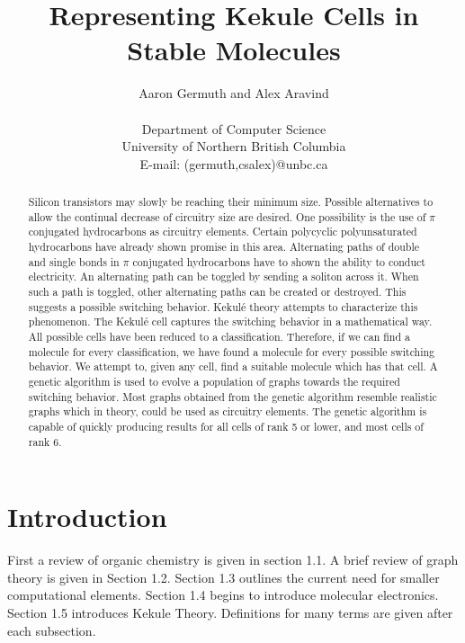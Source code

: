 \documentclass[12pt]{article}
\begin{document}
\title{Representing Kekule Cells in Stable Molecules}
\author{Aaron Germuth and Alex Aravind \\\\  
Department of Computer Science \\
University of Northern British Columbia \\
E-mail: (germuth,csalex)@unbc.ca}
\maketitle


\begin{abstract}

Silicon transistors may slowly be reaching their minimum size. Possible alternatives to allow the continual decrease of circuitry size are desired. One possibility is the use of $\pi$ conjugated hydrocarbons as circuitry elements.  Certain polycyclic polyunsaturated hydrocarbons have already shown promise in this area. Alternating paths of double and single bonds in $\pi$ conjugated hydrocarbons have to shown the ability to conduct electricity. An alternating path can be toggled by sending a soliton across it. When such a path is toggled, other alternating paths can be created or destroyed. This suggests a possible switching behavior. Kekul\'e theory attempts to characterize this phenomenon. The Kekul\'e cell captures the switching behavior in a mathematical way. All possible cells have been reduced to a classification. Therefore, if we can find a molecule for every classification, we have found a molecule for every possible switching behavior. We attempt to, given any cell, find a suitable molecule which has that cell. A genetic algorithm is used to evolve a population of graphs towards the required switching behavior. Most graphs obtained from the genetic algorithm resemble realistic graphs which in theory, could be used as circuitry elements. The genetic algorithm is capable of quickly producing results for all cells of rank 5 or lower, and most cells of rank 6.

\end{abstract}

\section{Introduction}

First a review of organic chemistry is given in section 1.1. A brief review of graph theory is given in Section 1.2. Section 1.3 outlines the current need for smaller computational elements. Section 1.4 begins to introduce molecular electronics. Section 1.5 introduces Kekule Theory.  Definitions for many terms are given after each subsection.
\end{document}
